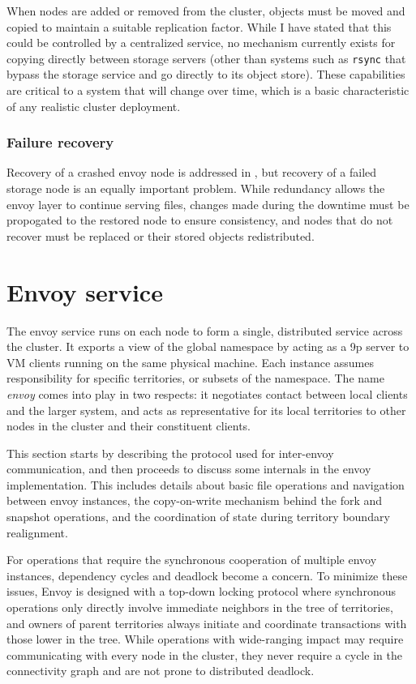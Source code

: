 When nodes are added or removed from the cluster, objects must be moved and copied to maintain a suitable replication factor. While I have stated that this could be controlled by a centralized service, no mechanism currently exists for copying directly between storage servers (other than systems such as \texttt{rsync} that bypass the storage service and go directly to its object store). These capabilities are critical to a system that will change over time, which is a basic characteristic of any realistic cluster deployment.

\subsubsection{Failure recovery}

Recovery of a crashed envoy node is addressed in , but recovery of a failed storage node is an equally important problem. While redundancy allows the envoy layer to continue serving files, changes made during the downtime must be propogated to the restored node to ensure consistency, and nodes that do not recover must be replaced or their stored objects redistributed.

\section{Envoy service}

The envoy service runs on each node to form a single, distributed service across the cluster. It exports a view of the global namespace by acting as a 9p server to VM clients running on the same physical machine. Each instance assumes responsibility for specific territories, or subsets of the namespace. The name \emph{envoy} comes into play in two respects: it negotiates contact between local clients and the larger system, and acts as representative for its local territories to other nodes in the cluster and their constituent clients.

This section starts by describing the protocol used for inter-envoy communication, and then proceeds to discuss some internals in the envoy implementation. This includes details about basic file operations and navigation between envoy instances, the copy-on-write mechanism behind the fork and snapshot operations, and the coordination of state during territory boundary realignment.

For operations that require the synchronous cooperation of multiple envoy instances, dependency cycles and deadlock become a concern. To minimize these issues, Envoy is designed with a top-down locking protocol where synchronous operations only directly involve immediate neighbors in the tree of territories, and owners of parent territories always initiate and coordinate transactions with those lower in the tree. While operations with wide-ranging impact may require communicating with every node in the cluster, they never require a cycle in the connectivity graph and are not prone to distributed deadlock.

